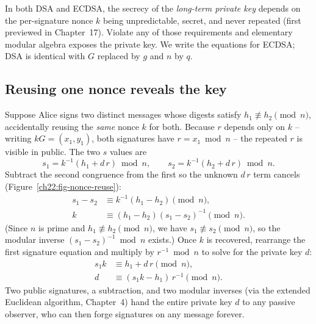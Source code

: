 In both DSA and ECDSA, the secrecy of the \emph{long-term private key} depends on the per-signature nonce $k$ being unpredictable, secret, and never repeated (first previewed in Chapter~17). Violate any of those requirements and elementary modular algebra exposes the private key. We write the equations for ECDSA; DSA is identical with $G$ replaced by $g$ and $n$ by $q$.

\subsection{Reusing one nonce reveals the key}
\label{ch22:nonce-reuse}

Suppose Alice signs two distinct messages whose digests satisfy $h_1 \not\equiv h_2 \pmod n$, accidentally reusing the \emph{same} nonce $k$ for both. Because $r$ depends only on $k$ -- writing $kG = (x_1, y_1)$, both signatures have $r = x_1 \bmod n$ -- the repeated $r$ is visible in public. The two $s$ values are
\[
  s_1 = k^{-1}(h_1 + d\,r)\bmod n, \qquad s_2 = k^{-1}(h_2 + d\,r)\bmod n.
\]
Subtract the second congruence from the first so the unknown $d\,r$ term cancels (Figure~\ref{ch22:fig-nonce-reuse}):
\begin{align*}
  s_1 - s_2 &\equiv k^{-1}(h_1 - h_2) \pmod n, \\
  k &\equiv (h_1 - h_2)(s_1 - s_2)^{-1} \pmod n.
\end{align*}
(Since $n$ is prime and $h_1 \not\equiv h_2 \pmod n$, we have $s_1 \not\equiv s_2 \pmod n$, so the modular inverse $(s_1 - s_2)^{-1} \bmod n$ exists.) Once $k$ is recovered, rearrange the first signature equation and multiply by $r^{-1} \bmod n$ to solve for the private key $d$:
\begin{align*}
  s_1 k &\equiv h_1 + d\,r \pmod n, \\
  d &\equiv (s_1 k - h_1)\,r^{-1} \pmod n.
\end{align*}
Two public signatures, a subtraction, and two modular inverses (via the extended Euclidean algorithm, Chapter~4) hand the entire private key $d$ to any passive observer, who can then forge signatures on any message forever.

